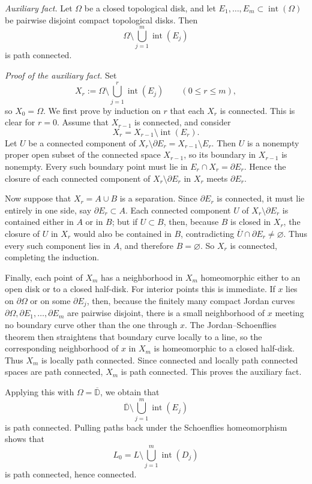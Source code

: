 \documentclass[12pt]{amsart}
\theoremstyle{definition}
\theoremstyle{remark}
\begin{document}
\medskip
\noindent\emph{Auxiliary fact.}
Let $\Omega$ be a closed topological disk, and let
$E_1,\dots,E_m\subset \operatorname{int}(\Omega)$ be pairwise disjoint compact
topological disks. Then
\[
\Omega\setminus \bigcup_{j=1}^m \operatorname{int}(E_j)
\]
is path connected.

\smallskip
\noindent\emph{Proof of the auxiliary fact.}
Set
\[
X_r:=\Omega\setminus \bigcup_{j=1}^r \operatorname{int}(E_j)
\qquad (0\le r\le m),
\]
so $X_0=\Omega$. We first prove by induction on $r$ that each $X_r$ is connected.
This is clear for $r=0$. Assume that $X_{r-1}$ is connected, and consider
\[
X_r=X_{r-1}\setminus \operatorname{int}(E_r).
\]
Let $U$ be a connected component of $X_r\setminus \partial E_r=X_{r-1}\setminus E_r$.
Then $U$ is a nonempty proper open subset of the connected space $X_{r-1}$, so its
boundary in $X_{r-1}$ is nonempty. Every such boundary point must lie in $E_r\cap X_r=\partial E_r$.
Hence the closure of each connected component of $X_r\setminus \partial E_r$ in $X_r$
meets $\partial E_r$.

Now suppose that $X_r=A\cup B$ is a separation. Since $\partial E_r$ is connected, it must lie
entirely in one side, say $\partial E_r\subset A$. Each connected component $U$ of
$X_r\setminus \partial E_r$ is contained either in $A$ or in $B$; but if $U\subset B$, then,
because $B$ is closed in $X_r$, the closure of $U$ in $X_r$ would also be contained in $B$,
contradicting $\overline U\cap \partial E_r\neq\varnothing$. Thus every such component lies in $A$,
and therefore $B=\varnothing$. So $X_r$ is connected, completing the induction.

Finally, each point of $X_m$ has a neighborhood in $X_m$ homeomorphic either to an open disk
or to a closed half-disk. For interior points this is immediate. If $x$ lies on $\partial\Omega$
or on some $\partial E_j$, then, because the finitely many compact Jordan curves
$\partial\Omega,\partial E_1,\dots,\partial E_m$ are pairwise disjoint, there is a small neighborhood
of $x$ meeting no boundary curve other than the one through $x$. The Jordan--Schoenflies theorem
then straightens that boundary curve locally to a line, so the corresponding neighborhood of $x$ in
$X_m$ is homeomorphic to a closed half-disk. Thus $X_m$ is locally path connected. Since connected
and locally path connected spaces are path connected, $X_m$ is path connected. This proves the auxiliary fact.
\medskip

Applying this with $\Omega=\overline{\mathbb D}$, we obtain that
\[
\overline{\mathbb D}\setminus \bigcup_{j=1}^m \operatorname{int}(E_j)
\]
is path connected. Pulling paths back under the Schoenflies homeomorphism shows that
\[
L_0
=
L\setminus \bigcup_{j=1}^m \operatorname{int}(D_j)
\]
is path connected, hence connected.
\end{document}
